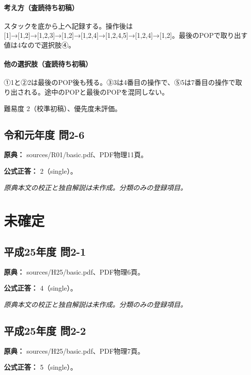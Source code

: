 \paragraph{考え方（査読待ち初稿）} スタックを底から上へ記録する。操作後は [1]→[1,2]→[1,2,3]→[1,2]→[1,2,4]→[1,2,4,5]→[1,2,4]→[1,2]。最後のPOPで取り出す値は4なので選択肢④。

\paragraph{他の選択肢（査読待ち初稿）} ①1と②2は最後のPOP後も残る。③3は4番目の操作で、⑤5は7番目の操作で取り出される。途中のPOPと最後のPOPを混同しない。

\par 難易度 2（校準初稿）、優先度未評価。

\subsection{令和元年度 問2-6}
\label{q:r01-reg-basic-2-6}

\noindent\textbf{原典：} sources/R01/basic.pdf、PDF物理11頁。

\textbf{公式正答：} 2（single）。

\par\textit{原典本文の校正と独自解説は未作成。分類のみの登録項目。}

\section{未確定}

\subsection{平成25年度 問2-1}
\label{q:h25-reg-basic-2-1}

\noindent\textbf{原典：} sources/H25/basic.pdf、PDF物理6頁。

\textbf{公式正答：} 4（single）。

\par\textit{原典本文の校正と独自解説は未作成。分類のみの登録項目。}

\subsection{平成25年度 問2-2}
\label{q:h25-reg-basic-2-2}

\noindent\textbf{原典：} sources/H25/basic.pdf、PDF物理7頁。

\textbf{公式正答：} 5（single）。

